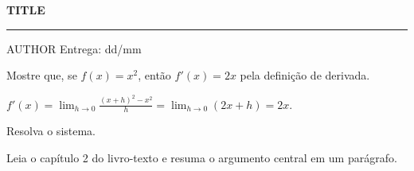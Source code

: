 \documentclass[11pt,a4paper]{exam}
\begin{document}
{\Large\bfseries {{TITLE}}}\par
{\color{tocaHoney}\rule{2.5cm}{2pt}}\par\smallskip
{\small {{AUTHOR}} \textbullet{} Entrega: dd/mm}

\vspace{1em}
\begin{questions}

\question Mostre que, se $f(x) = x^2$, então $f'(x) = 2x$ pela definição de derivada.
\begin{solution}
  $f'(x) = \lim_{h\to 0} \frac{(x+h)^2 - x^2}{h} = \lim_{h \to 0} (2x + h) = 2x$.
\end{solution}

\question Resolva o sistema.

\question Leia o capítulo 2 do livro-texto e resuma o argumento central em um parágrafo.
\fillwithlines{4cm}

\end{questions}
\end{document}
